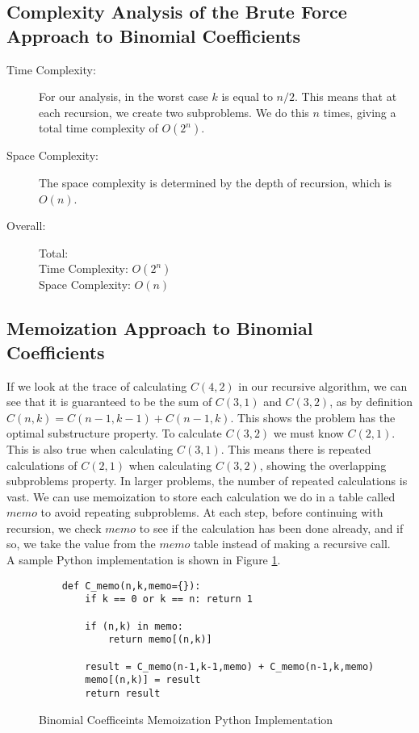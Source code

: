 \subsection{Complexity Analysis of the Brute Force Approach to Binomial Coefficients}
\begin{description}
    \item[Time Complexity:]
        For our analysis, in the worst case $k$ is equal to $n/2$.
        This means that at each recursion,
        we create two subproblems.
        We do this $n$ times, giving a total time complexity of $O(2^n)$.

    \item[Space Complexity:] 
        The space complexity is determined by the depth of recursion, which is $O(n)$.

    \item[Overall:] Total:\\
        Time Complexity: $O(2^n)$\\
        Space Complexity: $O(n)$
    
\end{description}

\subsection{Memoization Approach to Binomial Coefficients}
If we look at the trace of calculating $C(4,2)$ in our recursive algorithm, we can see that it is guaranteed to be the sum of $C(3,1)$ and $C(3,2)$, as by definition $C(n,k) = C(n-1,k-1) + C(n-1, k)$.
This shows the problem has the optimal substructure property.
To calculate $C(3,2)$ we must know $C(2,1)$.
This is also true when calculating $C(3,1)$.
This means there is repeated calculations of $C(2,1)$ when calculating $C(3,2)$,
showing the overlapping subproblems property.
In larger problems, the number of repeated calculations is vast.
We can use memoization to store each calculation we do in a table called $memo$ to avoid repeating subproblems.
At each step, before continuing with recursion, we check $memo$ to see if the calculation has been done already, and if so, we take the value from the $memo$ table instead of making a recursive call.\\

A sample Python implementation is shown in Figure \ref{fig:binomial-memo}.

\begin{figure}[H]
    \centering
    \begin{lstlisting}
    def C_memo(n,k,memo={}):
        if k == 0 or k == n: return 1
    
        if (n,k) in memo:
            return memo[(n,k)]
        
        result = C_memo(n-1,k-1,memo) + C_memo(n-1,k,memo)
        memo[(n,k)] = result
        return result
    \end{lstlisting}
    \caption{Binomial Coefficeints Memoization Python Implementation}
    \label{fig:binomial-memo}
\end{figure}

